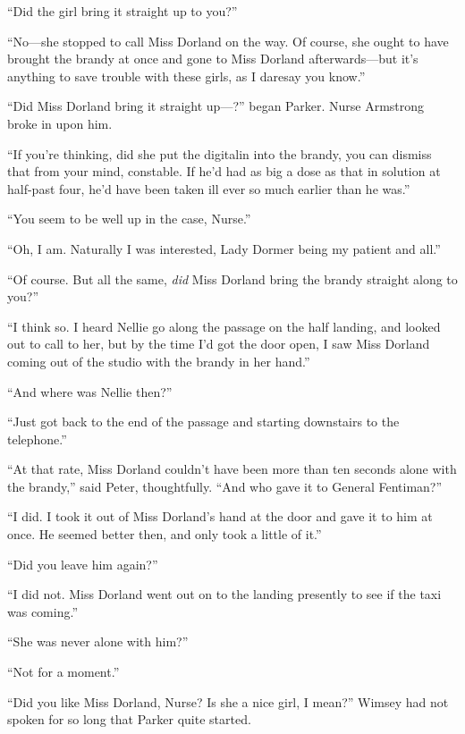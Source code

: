 \enquote{Did the girl bring it straight up to you?}

\enquote{No\allowbreak---\allowbreak she stopped to call Miss Dorland on the way. Of course, she ought to have brought the brandy at once and gone to Miss Dorland afterwards\allowbreak---\allowbreak but it's anything to save trouble with these girls, as I daresay you know.}

\enquote{Did Miss Dorland bring it straight up---?} began Parker. Nurse Armstrong broke in upon him.

\enquote{If you're thinking, did she put the digitalin into the brandy, you can dismiss that from your mind, constable. If he'd had as big a dose as that in solution at half-past four, he'd have been taken ill ever so much earlier than he was.}

\enquote{You seem to be well up in the case, Nurse.}

\enquote{Oh, I am. Naturally I was interested, Lady Dormer being my patient and all.}

\enquote{Of course. But all the same, \textit{did} Miss Dorland bring the brandy straight along to you?}

\enquote{I think so. I heard Nellie go along the passage on the half landing, and looked out to call to her, but by the time I'd got the door open, I saw Miss Dorland coming out of the studio with the brandy in her hand.}

\enquote{And where was Nellie then?}

\enquote{Just got back to the end of the passage and starting downstairs to the telephone.}

\enquote{At that rate, Miss Dorland couldn't have been more than ten seconds alone with the brandy,} said Peter, thoughtfully. \enquote{And who gave it to General Fentiman?}

\enquote{I did. I took it out of Miss Dorland's hand at the door and gave it to him at once. He seemed better then, and only took a little of it.}

\enquote{Did you leave him again?}

\enquote{I did not. Miss Dorland went out on to the landing presently to see if the taxi was coming.}

\enquote{She was never alone with him?}

\enquote{Not for a moment.}

\enquote{Did you like Miss Dorland, Nurse? Is she a nice girl, I mean?} Wimsey had not spoken for so long that Parker quite started.

